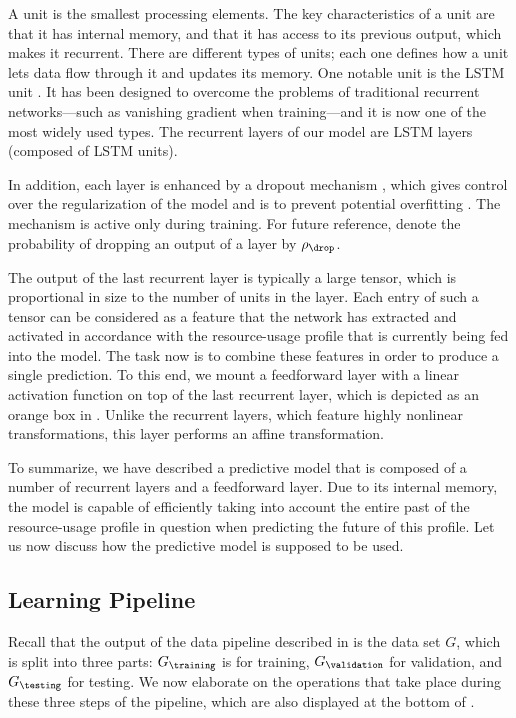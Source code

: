 A unit is the smallest processing elements. The key characteristics of a unit
are that it has internal memory, and that it has access to its previous output,
which makes it recurrent. There are different types of units; each one defines
how a unit lets data flow through it and updates its memory. One notable unit is
the \ac{LSTM} unit \cite{hochreiter1997}. It has been designed to overcome the
problems of traditional recurrent networks---such as vanishing gradient when
training---and it is now one of the most widely used types. The recurrent layers
of our model are \ac{LSTM} layers (composed of \ac{LSTM} units).

In addition, each layer is enhanced by a dropout mechanism \cite{zaremba2014},
which gives control over the regularization of the model and is to prevent
potential overfitting \cite{hastie2013}. The mechanism is active only during
training. For future reference, denote the probability of dropping an output of
a layer by $\rho_\drop$.

The output of the last recurrent layer is typically a large tensor, which is
proportional in size to the number of units in the layer. Each entry of such a
tensor can be considered as a feature that the network has extracted and
activated in accordance with the resource-usage profile that is currently being
fed into the model. The task now is to combine these features in order to
produce a single prediction. To this end, we mount a feedforward layer with a
linear activation function on top of the last recurrent layer, which is depicted
as an orange box in . Unlike the recurrent layers,
which feature highly nonlinear transformations, this layer performs an affine
transformation.

To summarize, we have described a predictive model that is composed of a number
of recurrent layers and a feedforward layer. Due to its internal memory, the
model is capable of efficiently taking into account the entire past of the
resource-usage profile in question when predicting the future of this profile.
Let us now discuss how the predictive model is supposed to be used.

\subsection{Learning Pipeline}

Recall that the output of the data pipeline described in
 is the data set $G$, which is split into three parts:
$G_\training$ is for training, $G_\validation$ for validation, and $G_\testing$
for testing. We now elaborate on the operations that take place during these
three steps of the pipeline, which are also displayed at the bottom of
.

